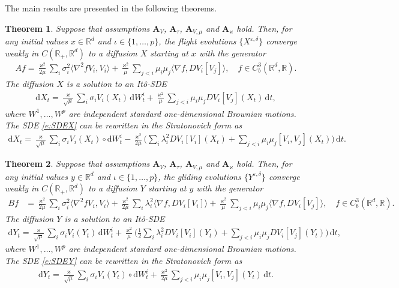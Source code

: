 \documentclass[10pt]{article}
\newcommand{\1}{1\!\!\!\;{\rm I}}
\theoremstyle{plain}
\newtheorem{thm}{Theorem}[section]
\theoremstyle{definition}
\newcommand{\e}{\varepsilon}
\newcommand{\ba}{\begin{equation}\begin{aligned}}
\newcommand{\ea}{\end{aligned}\end{equation}}
\newcommand{\di}{\mathrm{d}}
\newcommand{\bR}{\mathbb{R}}
\numberwithin{equation}{section}
\begin{document}
The main results are presented in the following theorems.

\begin{thm}
\label{t:A}
Suppose that assumptions
$\mathbf{A}_V$,
$\mathbf{A}_\tau$,
$\mathbf{A}_{V,\mu}$ and
$\mathbf{A}_\varkappa$ hold. Then, for any initial values $x\in\bR^d$ and $\iota\in \{1,\dots,p\}$,
the flight evolutions $\{X^{\e,\delta}\}$ converge weakly in $C(\bR_+,\bR^d)$
to a diffusion $X$ starting at $x$ with the generator
\ba
\label{e:opA}
Af
= \frac{\varkappa^2}{2\mu}  \sum_{i} \sigma_{i}^2 \langle \nabla^2 f  V_i, V_i\rangle
+ \frac{\varkappa^2}{\mu} \sum_{j< i} \mu_i\mu_j \langle \nabla f , D V_i [ V_j] \rangle,\quad f\in C^3_b(\bR^d,\bR).
\ea
The diffusion $X$ is a solution to an It\^o-SDE
\ba
\label{e:SDEX}
\di X_t= \frac{\varkappa}{\sqrt\mu}  \sum_{i} \sigma_{i} V_i(X_t)\,\di W^i_t +
\frac{\varkappa^2}{\mu} \sum_{j< i} \mu_i\mu_j  D V_i [ V_j](X_t)\,\di t,
\ea
where $W^1,\dots,W^p$ are independent standard one-dimensional Brownian motions.
The SDE \eqref{e:SDEX} can be rewritten in the Stratonovich form
as
\ba
\label{e:XStrat}
\di X_t= \frac{\varkappa}{\sqrt\mu}  \sum_{i} \sigma_{i} V_i(X_t)\circ\di W^i_t
-\frac{\varkappa^2}{2\mu} \Big(
\sum_{i} \lambda_i^2  D V_i [ V_i](X_t)
+\sum_{j< i} \mu_i\mu_j  [ V_i,V_j](X_t)
\Big)\,\di t.
\ea
\end{thm}

\begin{thm}
\label{t:B}
Suppose that assumptions
$\mathbf{A}_V$,
$\mathbf{A}_\tau$,
$\mathbf{A}_{V,\mu}$ and
$\mathbf{A}_\varkappa$ hold. Then, for any initial values $y\in\bR^d$ and $\iota\in \{1,\dots,p\}$,
the gliding evolutions $\{Y^{\e,\delta}\}$ converge weakly in $C(\bR_+,\bR^d)$
to a diffusion $Y$ starting at $y$ with the generator
\ba
\label{e:opB}
Bf
&=\frac{\varkappa^2}{2\mu} \sum_{i}  \sigma_{i}^2  \langle \nabla^2 f V_i ,V_i\rangle
+ \frac{\varkappa^2}{2\mu}\sum_{i} \lambda_{i}^2 \langle \nabla f, DV_i[V_i]\rangle
+\frac{\varkappa^2}{\mu}\sum_{j<i} \mu_i\mu_j \langle \nabla f, DV_i[V_j] \rangle
,\quad f\in C^3_b(\bR^d,\bR).
\ea
The diffusion $Y$ is a solution to an It\^o-SDE
\ba
\label{e:SDEY}
\di Y_t= \frac{\varkappa}{\sqrt\mu}  \sum_{i} \sigma_{i} V_i(Y_t)\,\di W^i_t +
\frac{\varkappa^2}{\mu} \Big(
\frac12\sum_{i} \lambda_{i}^2 DV_i[V_i](Y_t)
+\sum_{j< i} \mu_i\mu_j  D V_i [ V_j](Y_t)
\Big)\,\di t,
\ea
where $W^1,\dots,W^p$ are independent standard one-dimensional Brownian motions.
The SDE \eqref{e:SDEY} can be rewritten in the Stratonovich form
as
\ba
\label{e:SDEYStrat}
\di Y_t= \frac{\varkappa}{\sqrt\mu}  \sum_{i} \sigma_{i} V_i(Y_t)\circ\di W^i_t
+\frac{\varkappa^2}{2\mu} \sum_{j< i} \mu_i\mu_j  [ V_i,V_j](Y_t)\,\di t.
\ea
\end{thm}
\end{document}
